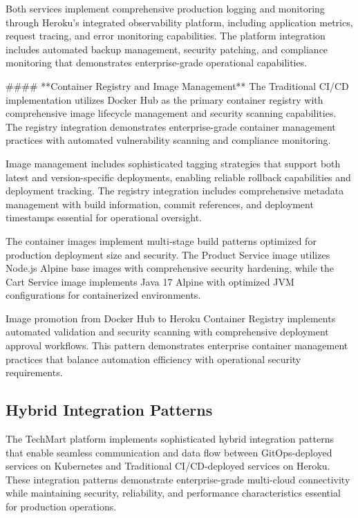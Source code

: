 Both services implement comprehensive production logging and monitoring through Heroku's integrated observability platform, including application metrics, request tracing, and error monitoring capabilities. The platform integration includes automated backup management, security patching, and compliance monitoring that demonstrates enterprise-grade operational capabilities.

#### **Container Registry and Image Management**
The Traditional CI/CD implementation utilizes Docker Hub as the primary container registry with comprehensive image lifecycle management and security scanning capabilities. The registry integration demonstrates enterprise-grade container management practices with automated vulnerability scanning and compliance monitoring.

Image management includes sophisticated tagging strategies that support both latest and version-specific deployments, enabling reliable rollback capabilities and deployment tracking. The registry integration includes comprehensive metadata management with build information, commit references, and deployment timestamps essential for operational oversight.

The container images implement multi-stage build patterns optimized for production deployment size and security. The Product Service image utilizes Node.js Alpine base images with comprehensive security hardening, while the Cart Service image implements Java 17 Alpine with optimized JVM configurations for containerized environments.

Image promotion from Docker Hub to Heroku Container Registry implements automated validation and security scanning with comprehensive deployment approval workflows. This pattern demonstrates enterprise container management practices that balance automation efficiency with operational security requirements.

\subsection{Hybrid Integration Patterns}

The TechMart platform implements sophisticated hybrid integration patterns that enable seamless communication and data flow between GitOps-deployed services on Kubernetes and Traditional CI/CD-deployed services on Heroku. These integration patterns demonstrate enterprise-grade multi-cloud connectivity while maintaining security, reliability, and performance characteristics essential for production operations.

